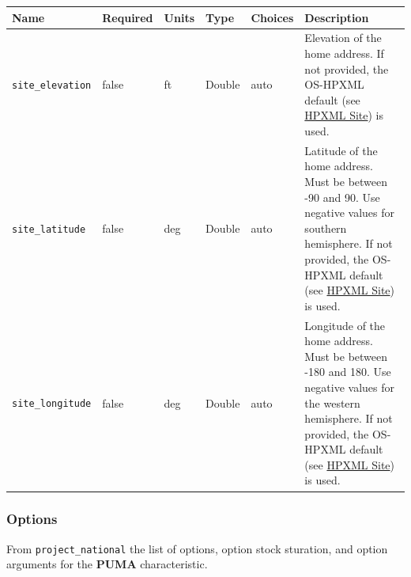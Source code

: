 \begin{longtable}[]{@{}llllll@{}}
\toprule\noalign{}
Name & Required & Units & Type & Choices & Description \\
\midrule\noalign{}
\endhead
\bottomrule\noalign{}
\endlastfoot
\texttt{site\_elevation} & false & ft & Double & auto & Elevation of the
home address. If not provided, the OS-HPXML default (see
\href{https://openstudio-hpxml.readthedocs.io/en/v1.7.0/workflow_inputs.html\#hpxml-site}{HPXML
Site}) is used. \\
\texttt{site\_latitude} & false & deg & Double & auto & Latitude of the
home address. Must be between -90 and 90. Use negative values for
southern hemisphere. If not provided, the OS-HPXML default (see
\href{https://openstudio-hpxml.readthedocs.io/en/v1.7.0/workflow_inputs.html\#hpxml-site}{HPXML
Site}) is used. \\
\texttt{site\_longitude} & false & deg & Double & auto & Longitude of
the home address. Must be between -180 and 180. Use negative values for
the western hemisphere. If not provided, the OS-HPXML default (see
\href{https://openstudio-hpxml.readthedocs.io/en/v1.7.0/workflow_inputs.html\#hpxml-site}{HPXML
Site}) is used. \\
\end{longtable}

\subsubsection{Options}\label{options-129}

From \texttt{project\_national} the list of options, option stock
sturation, and option arguments for the \textbf{PUMA} characteristic.

